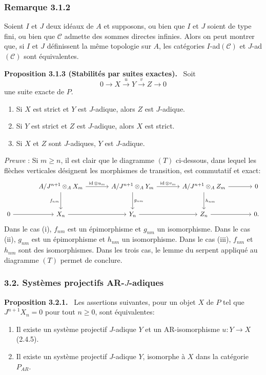 \documentclass[11pt]{article}
\newenvironment{statement}[1]{\par\medskip\noindent\textbf{#1.}\ }{\par\medskip}
\providecommand{\id}{\operatorname{id}}
\providecommand{\cC}{\mathcal C}
\providecommand{\id}{\operatorname{id}}
\providecommand{\id}{\operatorname{id}}
\providecommand{\id}{\operatorname{id}}
\providecommand{\id}{\operatorname{id}}
\providecommand{\cC}{\mathcal C}
\providecommand{\id}{\operatorname{id}}
\begin{document}
\subsubsection*{Remarque 3.1.2}
Soient $I$ et $J$ deux idéaux de $A$ et supposons, ou bien que $I$ et $J$ soient de type fini, ou bien que $\cC$ admette des sommes directes infinies. Alors on peut montrer que, si $I$ et $J$ définissent la même topologie sur $A$, les catégories $I$-ad$(\cC)$ et $J$-ad$(\cC)$ sont équivalentes.

\begin{statement}{Proposition 3.1.3 (Stabilités par suites exactes)}
Soit
\[
0\longrightarrow X\stackrel{u}{\longrightarrow}Y\stackrel{v}{\longrightarrow}Z\longrightarrow0
\]
une suite exacte de $P$.
\begin{enumerate}[label=(\roman*)]
\item Si $X$ est strict et $Y$ est $J$-adique, alors $Z$ est $J$-adique.
\item Si $Y$ est strict et $Z$ est $J$-adique, alors $X$ est strict.
\item Si $X$ et $Z$ sont $J$-adiques, $Y$ est $J$-adique.
\end{enumerate}
\end{statement}

\emph{Preuve} : Si $m\ge n$, il est clair que le diagramme $(T)$ ci-dessous, dans lequel les flèches verticales désignent les morphismes de transition, est commutatif et exact:
\[
\begin{tikzcd}[column sep=large,row sep=large]
{} & A/J^{n+1}\otimes_A X_m \arrow[r,"\id\otimes u_m"] \arrow[d,"f_{nm}"'] & A/J^{n+1}\otimes_A Y_m \arrow[r,"\id\otimes v_m"] \arrow[d,"g_{nm}"] & A/J^{n+1}\otimes_A Z_m \arrow[r] \arrow[d,"h_{nm}"] & 0\\
0 \arrow[r] & X_n \arrow[r] & Y_n \arrow[r] & Z_n \arrow[r] & 0 .
\end{tikzcd}
\]
Dans le cas (i), $f_{nm}$ est un épimorphisme et $g_{nm}$ un isomorphisme. Dans le cas (ii), $g_{nm}$ est un épimorphisme et $h_{nm}$ un isomorphisme. Dans le cas (iii), $f_{nm}$ et $h_{nm}$ sont des isomorphismes. Dans les trois cas, le lemme du serpent appliqué au diagramme $(T)$ permet de conclure.

\subsubsection*{3.2. Systèmes projectifs AR-$J$-adiques}
\begin{statement}{Proposition 3.2.1}
Les assertions suivantes, pour un objet $X$ de $P$ tel que $J^{n+1}X_n=0$ pour tout $n\ge0$, sont équivalentes:
\begin{enumerate}[label=(\roman*)]
\item Il existe un système projectif $J$-adique $Y$ et un AR-isomorphisme $u:Y\to X$ (2.4.5).
\item Il existe un système projectif $J$-adique $Y$, isomorphe à $X$ dans la catégorie $P_{AR}$.
\end{enumerate}
\end{statement}
\end{document}

